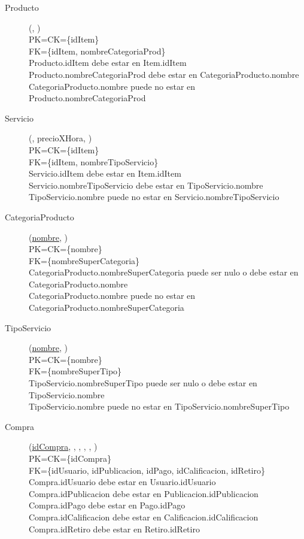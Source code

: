 \begin{description}
 \item[Producto](\underline{}, )\\
PK=CK=\{idItem\}\\
FK=\{idItem, nombreCategoriaProd\}\\
Producto.idItem debe estar en Item.idItem\\
Producto.nombreCategoriaProd debe estar en CategoriaProducto.nombre\\
CategoriaProducto.nombre puede no estar en Producto.nombreCategoriaProd

 \item[Servicio](\underline{}, precioXHora, )\\
PK=CK=\{idItem\}\\
FK=\{idItem, nombreTipoServicio\}\\
Servicio.idItem debe estar en Item.idItem\\
Servicio.nombreTipoServicio debe estar en TipoServicio.nombre\\
TipoServicio.nombre puede no estar en Servicio.nombreTipoServicio

 \item[CategoriaProducto](\underline{nombre}, )\\
PK=CK=\{nombre\}\\
FK=\{nombreSuperCategoria\}\\
CategoriaProducto.nombreSuperCategoria puede ser nulo o debe estar en CategoriaProducto.nombre\\
CategoriaProducto.nombre puede no estar en CategoriaProducto.nombreSuperCategoria

 \item[TipoServicio](\underline{nombre}, )\\
PK=CK=\{nombre\}\\
FK=\{nombreSuperTipo\}\\
TipoServicio.nombreSuperTipo puede ser nulo o debe estar en TipoServicio.nombre\\
TipoServicio.nombre puede no estar en TipoServicio.nombreSuperTipo


 \item[Compra](\underline{idCompra}, , , , , )\\
PK=CK=\{idCompra\}\\
FK=\{idUsuario, idPublicacion, idPago, idCalificacion, idRetiro\}\\
Compra.idUsuario debe estar en Usuario.idUsuario \\
Compra.idPublicacion debe estar en Publicacion.idPublicacion
Compra.idPago debe estar en Pago.idPago \\
Compra.idCalificacion debe estar en Calificacion.idCalificacion \\
Compra.idRetiro debe estar en Retiro.idRetiro 


\end{description}
